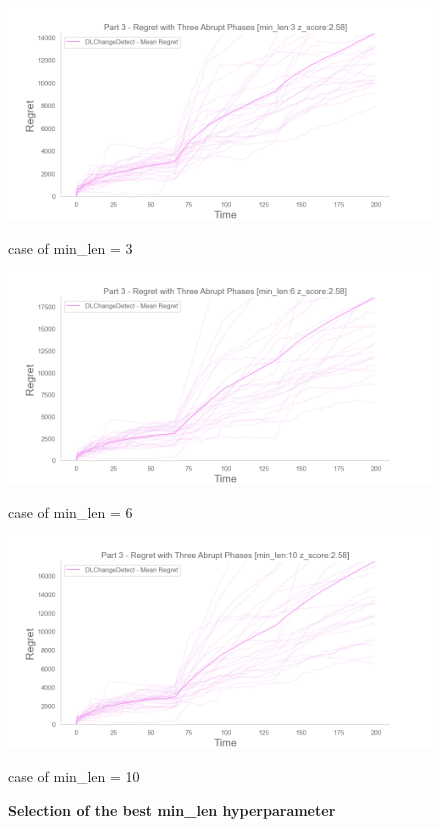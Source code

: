 \begin{figure}[!htb]
	\centering

  		\includegraphics[width=\linewidth]{images/part3_min-len3_z_score2_58.png}
  		\caption{case of min\_len = 3}\label{minlen3}  		
	\endminipage\hfill
  		\includegraphics[width=\linewidth]{images/part3_min-len6_z_score2_58.png}
  		\caption{case of min\_len = 6}\label{minlen6}  
	\endminipage\hfill
  		\includegraphics[width=\linewidth]{images/part3_min-len10_z_score2_58.png}
  		\caption{case of min\_len = 10}\label{minlen10}  
	\endminipage\hfill
	
	\caption{\textbf{Selection of the best min\_len hyperparameter}}
	\label{minLenValidationFig}
\end{figure}



